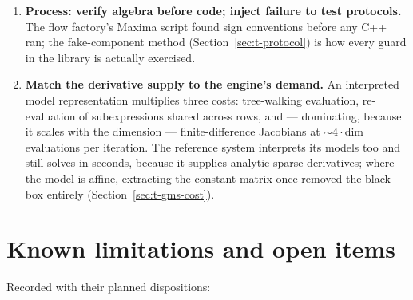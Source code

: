 \begin{enumerate}
{  multiplicity.} Fixed answers where the answer is unique (both
  case-study checks), fixed \emph{counts} of passing rows where engines
  legitimately differ, self-extending rosters where equilibria multiply
  (Section~\ref{sec:t-infra}).
\item \textbf{Process: verify algebra before code; inject failure to test
  protocols.} The flow factory's Maxima script \cite{maxima} found sign
  conventions before any C++ ran; the fake-component method
  (Section~\ref{sec:t-protocol}) is how every guard in the library is
  actually exercised.
\item \textbf{Match the derivative supply to the engine's demand.} An
  interpreted model representation multiplies three costs: tree-walking
  evaluation, re-evaluation of subexpressions shared across rows, and ---
  dominating, because it scales with the dimension --- finite-difference
  Jacobians at $\sim 4 \cdot \mathrm{dim}$ evaluations per iteration.
  The reference system interprets its models too and still solves in
  seconds, because it supplies analytic sparse derivatives; where the
  model is affine, extracting the constant matrix once removed the
  black box entirely (Section~\ref{sec:t-gms-cost}).
\end{enumerate}

\section{Known limitations and open items}
\label{sec:t-open}

Recorded with their planned dispositions:


